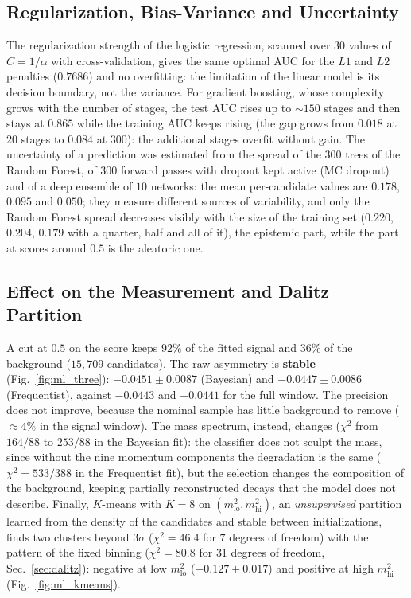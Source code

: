 \subsection{Regularization, Bias-Variance and Uncertainty}
\label{sec:ml_regcal_body}
\label{sec:ml_uncertainty_body}
The regularization strength of the logistic regression, scanned over $30$ values of $C=1/\alpha$ with cross-validation, gives the same optimal AUC for the $L1$ and $L2$ penalties ($0.7686$) and no overfitting: the limitation of the linear model is its decision boundary, not the variance. For gradient boosting, whose complexity grows with the number of stages, the test AUC rises up to $\sim150$ stages and then stays at $0.865$ while the training AUC keeps rising (the gap grows from $0.018$ at $20$ stages to $0.084$ at $300$): the additional stages overfit without gain. %
The uncertainty of a prediction was estimated from the spread of the $300$ trees of the Random Forest, of $300$ forward passes with dropout kept active (MC dropout) and of a deep ensemble of $10$ networks: the mean per-candidate values are $0.178$, $0.095$ and $0.050$; they measure different sources of variability, and only the Random Forest spread decreases visibly with the size of the training set ($0.220$, $0.204$, $0.179$ with a quarter, half and all of it), the epistemic part, while the part at scores around $0.5$ is the aleatoric one.
\subsection{Effect on the Measurement and Dalitz Partition}
\label{sec:ml_stability_body}
\label{sec:ml_kmeans_body}
A cut at $0.5$ on the score keeps $92\%$ of the fitted signal and $36\%$ of the background ($15{,}709$ candidates). The raw asymmetry is \textbf{stable} (Fig.~\ref{fig:ml_three}): $-0.0451\pm0.0087$ (Bayesian) and $-0.0447\pm0.0086$ (Frequentist), against $-0.0443$ and $-0.0441$ for the full window. The precision does not improve, because the nominal sample has little background to remove ($\approx4\%$ in the signal window). The mass spectrum, instead, changes ($\chi^2$ from $164/88$ to $253/88$ in the Bayesian fit): the classifier does not sculpt the mass, since without the nine momentum components the degradation is the same ($\chi^2=533/388$ in the Frequentist fit), but the selection changes the composition of the background, keeping partially reconstructed decays that the model does not describe. Finally, $K$-means with $K=8$ on $(m^2_{\mathrm{lo}},m^2_{\mathrm{hi}})$, an \emph{unsupervised} partition learned from the density of the candidates and stable between initializations, finds two clusters beyond $3\sigma$ ($\chi^2=46.4$ for $7$ degrees of freedom) with the pattern of the fixed binning ($\chi^2=80.8$ for $31$ degrees of freedom, Sec.~\ref{sec:dalitz}): negative at low $m^2_{\mathrm{lo}}$ ($-0.127\pm0.017$) and positive at high $m^2_{\mathrm{hi}}$ (Fig.~\ref{fig:ml_kmeans}).

